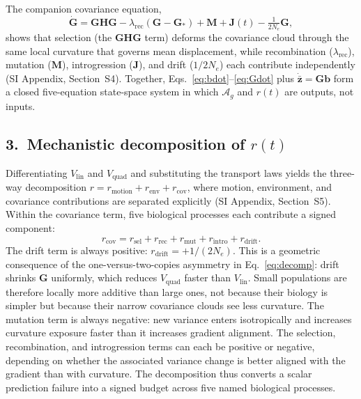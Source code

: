 \documentclass[9pt,twocolumn,twoside]{pnas-new}
\newcommand{\vect}[1]{\boldsymbol{#1}}
\newcommand{\mat}[1]{\mathbf{#1}}
\newcommand{\Ag}{\mathcal{A}_{g}}
\newcommand{\Vlin}{V_{\mathrm{lin}}}
\newcommand{\Vquad}{V_{\mathrm{quad}}}
\begin{document}
The companion covariance equation,
\begin{equation}
\dot{\mat{G}}
= \mat{G}\mat{H}\mat{G}
  - \lambda_{\mathrm{rec}}(\mat{G} - \mat{G}_*)
  + \mat{M}
  + \mat{J}(t)
  - \tfrac{1}{2N_e}\mat{G},
\label{eq:Gdot}
\end{equation}
shows that selection (the $\mat{G}\mat{H}\mat{G}$ term) deforms the
covariance cloud through the same local curvature that governs
mean displacement, while recombination ($\lambda_{\mathrm{rec}}$),
mutation ($\mat{M}$), introgression ($\mat{J}$), and drift
($1/2N_e$) each contribute independently
(SI Appendix, Section~S4).
Together, Eqs.~\eqref{eq:bdot}--\eqref{eq:Gdot} plus
$\dot{\bar{\vect{z}}} = \mat{G}\vect{b}$ form a closed five-equation
state-space system in which $\Ag$ and $r(t)$ are outputs, not inputs.

\subsection*{3.~Mechanistic decomposition of $r(t)$}

Differentiating $\Vlin$ and $\Vquad$ and substituting the transport
laws yields the three-way decomposition
$r = r_{\mathrm{motion}} + r_{\mathrm{env}} + r_{\mathrm{cov}}$,
where motion, environment, and covariance contributions are
separated explicitly (SI Appendix, Section~S5).
Within the covariance term, five biological processes each
contribute a signed component:
\begin{equation}
r_{\mathrm{cov}}
= r_{\mathrm{sel}}
+ r_{\mathrm{rec}}
+ r_{\mathrm{mut}}
+ r_{\mathrm{intro}}
+ r_{\mathrm{drift}}.
\label{eq:rcov}
\end{equation}
The drift term is always positive:
$r_{\mathrm{drift}} = +1/(2N_e)$.
This is a geometric consequence of the one-versus-two-copies
asymmetry in Eq.~\eqref{eq:decomp}: drift shrinks $\mat{G}$
uniformly, which reduces $\Vquad$ faster than $\Vlin$.
Small populations are therefore locally more additive than large
ones, not because their biology is simpler but because their narrow
covariance clouds see less curvature.
The mutation term is always negative: new variance enters
isotropically and increases curvature exposure faster than it
increases gradient alignment.
The selection, recombination, and introgression terms can each be
positive or negative, depending on whether the associated variance
change is better aligned with the gradient than with curvature.
The decomposition thus converts a scalar prediction failure into a
signed budget across five named biological processes.
\end{document}
